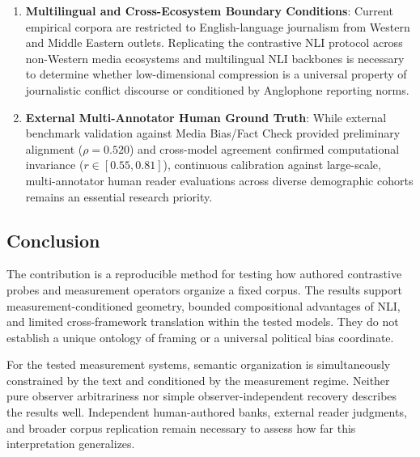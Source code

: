 \begin{enumerate}
    \item \textbf{Multilingual and Cross-Ecosystem Boundary Conditions}: Current empirical corpora are restricted to English-language journalism from Western and Middle Eastern outlets. Replicating the contrastive NLI protocol across non-Western media ecosystems and multilingual NLI backbones is necessary to determine whether low-dimensional compression is a universal property of journalistic conflict discourse or conditioned by Anglophone reporting norms.
    \item \textbf{External Multi-Annotator Human Ground Truth}: While external benchmark validation against Media Bias/Fact Check provided preliminary alignment ($\rho = 0.520$) and cross-model agreement confirmed computational invariance ($r \in [0.55, 0.81]$), continuous calibration against large-scale, multi-annotator human reader evaluations across diverse demographic cohorts remains an essential research priority.
\end{enumerate}

\subsection{Conclusion}

The contribution is a reproducible method for testing how authored contrastive probes and measurement operators organize a fixed corpus. The results support measurement-conditioned geometry, bounded compositional advantages of NLI, and limited cross-framework translation within the tested models. They do not establish a unique ontology of framing or a universal political bias coordinate.

For the tested measurement systems, semantic organization is simultaneously constrained by the text and conditioned by the measurement regime. Neither pure observer arbitrariness nor simple observer-independent recovery describes the results well. Independent human-authored banks, external reader judgments, and broader corpus replication remain necessary to assess how far this interpretation generalizes.
